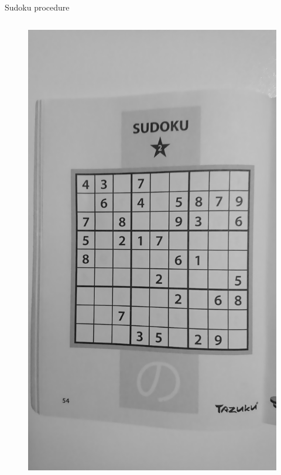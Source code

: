 \documentclass[12pt]{beamer}
\begin{document}
\begin{frame}{Sudoku procedure}
\begin{columns}
{\begin{figure}
            \includegraphics[width=\textwidth]{resources/png/sudoku_00018_01.png}
        \end{figure}
    }
\end{columns}
\end{frame}
\end{document}
